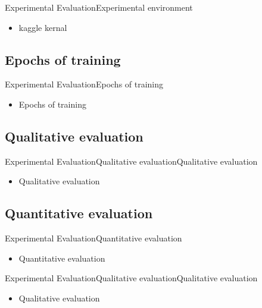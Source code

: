 \documentclass{beamer}
\begin{document}
\begin{CJK}{UTF8}{}
\begin{frame}{Experimental Evaluation}{Experimental environment}
	\begin{itemize}
	\item{
		kaggle kernal
	}
	\end{itemize}
\end{frame}

\subsection{Epochs of training}

\begin{frame}{Experimental Evaluation}{Epochs of training}
	\begin{itemize}
	\item{
		Epochs of training
	}
	\end{itemize}
\end{frame}

\subsection{Qualitative evaluation}

\begin{frame}{Experimental Evaluation}{Qualitative evaluationQualitative evaluation}
	\begin{itemize}
	\item{
		Qualitative evaluation
	}
	\end{itemize}
\end{frame}

\subsection{Quantitative evaluation}

\begin{frame}{Experimental Evaluation}{Quantitative evaluation}
	\begin{itemize}
	\item{
		Quantitative evaluation
	}
	\end{itemize}
\end{frame}

\begin{frame}{Experimental Evaluation}{Qualitative evaluationQualitative evaluation}
	\begin{itemize}
	\item{
		Qualitative evaluation
	}
	\end{itemize}
\end{frame}






\end{CJK}
\end{document}
